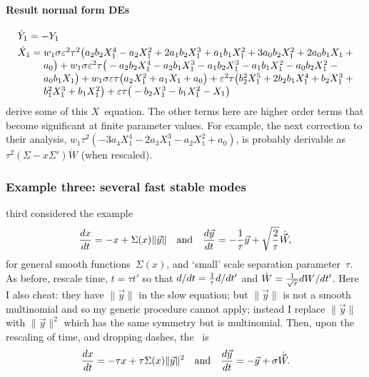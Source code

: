 \paragraph{Result normal form DEs}
\begin{align*}&
\dot Y_{1}=-Y_{1}
\\&
\dot X_{1}=\ParMath{ w_{1} \sigma  \eps^{2} \tau ^{2} \big(a_{2} b_{2} X_{1}^{4}-a
_{2} X_{1}^{2}+2 a_{1} b_{2} X_{1}^{3}+a_{1} b_{1} X_{1}^{2}+3 a_{0} b_{
2} X_{1}^{2}+2 a_{0} b_{1} X_{1}+a_{0}\big)+w_{1} \sigma  \eps^{2} \tau 
 \big(-a_{2} b_{2} X_{1}^{4}-a_{2} b_{1} X_{1}^{3}-a_{1} b_{2} X_{1}^{3}
-a_{1} b_{1} X_{1}^{2}-a_{0} b_{2} X_{1}^{2}-a_{0} b_{1} X_{1}\big)+w_{1
} \sigma  \eps \tau  \big(a_{2} X_{1}^{2}+a_{1} X_{1}+a_{0}\big)+\eps^{2
} \tau  \big(b_{2}^{2} X_{1}^{5}+2 b_{2} b_{1} X_{1}^{4}+b_{2} X_{1}^{3}
+b_{1}^{2} X_{1}^{3}+b_{1} X_{1}^{2}\big)+\eps \tau  \big(-b_{2} X_{1}^{
3}-b_{1} X_{1}^{2}-X_{1}\big)
}
\end{align*}
\cite{Monahan2011} derive some of this $X$~equation.  
The other terms here are higher order terms that become significant at finite parameter values.  
For example, the next correction to their analysis, $w_{1}  \tau ^{2} 
(-3 a_{4} X_{1}^{4}-2 a_{3} X_{1}^{3}-a_{2} X_{1}^{2}+a_{0})$, is probably derivable as $\tau^2(\Sigma-x\Sigma')\dot W$ (when rescaled).




\subsubsection{Example three: several fast stable modes}

\cite{Monahan2011} third considered the example
\begin{equation*}
\de tx=-x+\Sigma(x)\|\vec y\| \qtq{and}
\de t{\vec y}=-\frac1\tau \vec y+\sqrt{\frac2\tau}\dot{\vec W},
\end{equation*}
for general smooth functions~$\Sigma(x)$, and `small' scale separation parameter~\(\tau\).
As before, rescale time, $t=\tau t'$  so that $\de t{}=\frac1\tau\de{t'}{}$ and $\dot W=\frac1{\sqrt{\tau}}\de {t'}W$.
Here I also cheat: they have $\|\vec y\|$ in the slow equation; but $\|\vec y\|$ is not a smooth multinomial and so my generic procedure cannot apply; instead I replace $\|\vec y\|$ with $\|\vec y\|^2$ which has the same symmetry but is multinomial.
Then, upon the rescaling of time, and dropping dashes, the \sde\ is
\begin{equation*}
\de tx=-\tau x+\tau\Sigma(x)\|\vec y\|^2
\qtq{and}
\de t{\vec y}=- \vec y+\sigma\dot{\vec W}.
\end{equation*}


